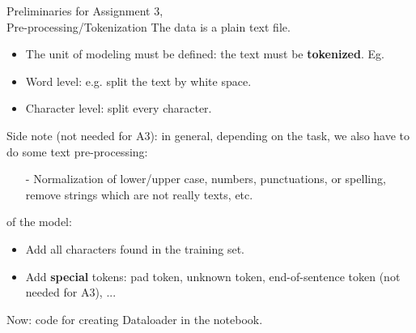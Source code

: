 \begin{frame}{Preliminaries for Assignment 3,\\
Pre-processing/Tokenization}
The data is a plain text file.
\begin{itemize}
\item The unit of modeling must be defined: the text must be \textbf{tokenized}. Eg.
\item Word level: e.g. split the text by white space.
\item Character level: split every character.
\end{itemize}
\vsp
Side note (not needed for A3): in general, depending on the task,
we also have to do some text pre-processing:
\begin{itemize}
\item[-] Normalization of lower/upper case, numbers, punctuations, or spelling, remove strings which are not really texts, etc.
\end{itemize}
 of the model:
\begin{itemize}
\item Add all characters found in the training set.
\item Add \textbf{special} tokens: pad token, unknown token, end-of-sentence token (not needed for A3), ...
\end{itemize}
Now: code for creating Dataloader in the notebook.
\end{frame}
%
%
%
%
%        
%        
%        
%        

